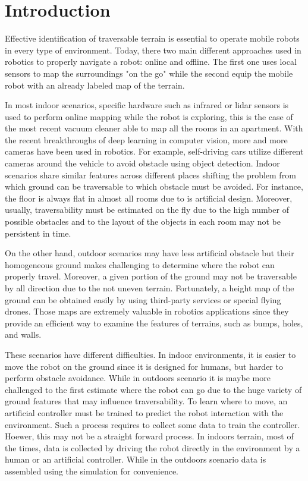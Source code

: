 \documentclass[../document.tex]{subfiles}
\begin{document}
\section{Introduction}
Effective identification of traversable terrain is essential to operate mobile robots in every type of environment. Today, there two main different approaches used in robotics to properly navigate a robot: online and offline. The first one uses local sensors to map the surroundings "on the go" while the second equip the mobile robot with an already labeled map of the terrain. 

In most indoor scenarios, specific hardware such as infrared or lidar sensors is used to perform online mapping while the robot is exploring, this is the case of the most recent vacuum cleaner able to map all the rooms in an apartment. With the recent breakthroughs of deep learning in computer vision, more and more cameras have been used in robotics. For example, self-driving cars utilize different cameras around the vehicle to avoid obstacle using object detection.
Indoor scenarios share similar features across different places shifting the problem from which ground can be traversable to which obstacle must be avoided. For instance, the floor is always flat in almost all rooms due to is artificial design. Moreover, usually, traversability must be estimated on the fly due to the high number of possible obstacles and to the layout of the objects in each room may not be persistent in time. 

On the other hand, outdoor scenarios may have less artificial obstacle but their homogeneous ground makes challenging to determine where the robot can properly travel. Moreover, a given portion of the ground may not be traversable by all direction due to the not uneven terrain. Fortunately, a height map of the ground can be obtained easily by using third-party services or special flying drones.  Those maps are extremely valuable in robotics applications since they provide an efficient way to examine the features of terrains, such as bumps, holes, and walls.

These scenarios have different difficulties. In indoor environments, it is easier to move the robot on the ground since it is designed for humans, but harder to perform obstacle
avoidance. While in outdoors scenario it is maybe more challenged to the first estimate where the robot can go due to the huge variety of ground features that may influence traversability. 
To learn where to move, an artificial controller must be trained to predict the robot interaction with the environment. Such a process requires to collect some data to train the controller. Hoewer, this may not be a straight forward process. 
In indoors terrain,  most of the times, data is collected by driving the robot directly in the environment by a human or an artificial controller. While in the outdoors scenario data is assembled using the simulation for convenience.
\end{document}
